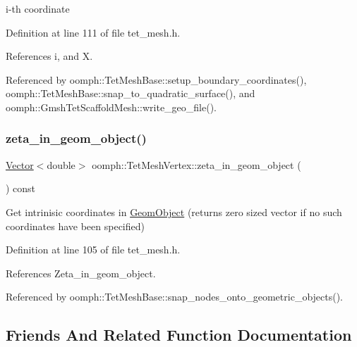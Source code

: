 i-\/th coordinate 



Definition at line 111 of file tet\+\_\+mesh.\+h.



References i, and X.



Referenced by oomph\+::\+Tet\+Mesh\+Base\+::setup\+\_\+boundary\+\_\+coordinates(), oomph\+::\+Tet\+Mesh\+Base\+::snap\+\_\+to\+\_\+quadratic\+\_\+surface(), and oomph\+::\+Gmsh\+Tet\+Scaffold\+Mesh\+::write\+\_\+geo\+\_\+file().

\mbox{\label{classoomph_1_1TetMeshVertex_a6d6ea2c9ca186e0a377505f37800ddaa}} 
\subsubsection{\texorpdfstring{zeta\+\_\+in\+\_\+geom\+\_\+object()}{zeta\_in\_geom\_object()}}
{\footnotesize\ttfamily \hyperlink{classoomph_1_1Vector}{Vector}$<$double$>$ oomph\+::\+Tet\+Mesh\+Vertex\+::zeta\+\_\+in\+\_\+geom\+\_\+object (\begin{DoxyParamCaption}{ }\end{DoxyParamCaption}) const\hspace{0.3cm}{\ttfamily [inline]}}



Get intrinisic coordinates in \hyperlink{classoomph_1_1GeomObject}{Geom\+Object} (returns zero sized vector if no such coordinates have been specified) 



Definition at line 105 of file tet\+\_\+mesh.\+h.



References Zeta\+\_\+in\+\_\+geom\+\_\+object.



Referenced by oomph\+::\+Tet\+Mesh\+Base\+::snap\+\_\+nodes\+\_\+onto\+\_\+geometric\+\_\+objects().



\subsection{Friends And Related Function Documentation}
\mbox{\label{classoomph_1_1TetMeshVertex_ae3c796a1351f1249d195202d011532ce}} 
